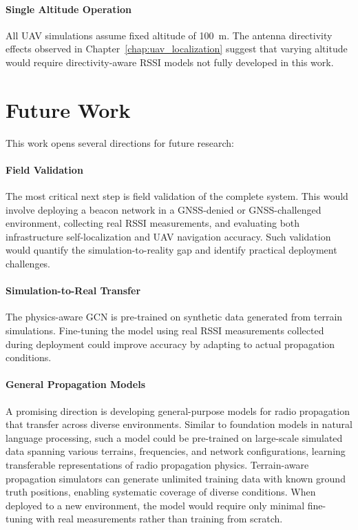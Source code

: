 \documentclass[master,final,11pt]{iscs-thesis}
\begin{document}
\paragraph{Single Altitude Operation}
All UAV simulations assume fixed altitude of 100~m.
The antenna directivity effects observed in Chapter~\ref{chap:uav_localization} suggest that varying altitude would require directivity-aware RSSI models not fully developed in this work.

\section{Future Work}
\label{sec:future_work}

This work opens several directions for future research:

\paragraph{Field Validation}
The most critical next step is field validation of the complete system.
This would involve deploying a beacon network in a GNSS-denied or GNSS-challenged environment, collecting real RSSI measurements, and evaluating both infrastructure self-localization and UAV navigation accuracy.
Such validation would quantify the simulation-to-reality gap and identify practical deployment challenges.

\paragraph{Simulation-to-Real Transfer}
The physics-aware GCN is pre-trained on synthetic data generated from terrain simulations.
Fine-tuning the model using real RSSI measurements collected during deployment could improve accuracy by adapting to actual propagation conditions.

\paragraph{General Propagation Models}
A promising direction is developing general-purpose models for radio propagation that transfer across diverse environments.
Similar to foundation models in natural language processing, such a model could be pre-trained on large-scale simulated data spanning various terrains, frequencies, and network configurations, learning transferable representations of radio propagation physics.
Terrain-aware propagation simulators can generate unlimited training data with known ground truth positions, enabling systematic coverage of diverse conditions.
When deployed to a new environment, the model would require only minimal fine-tuning with real measurements rather than training from scratch.
\end{document}
